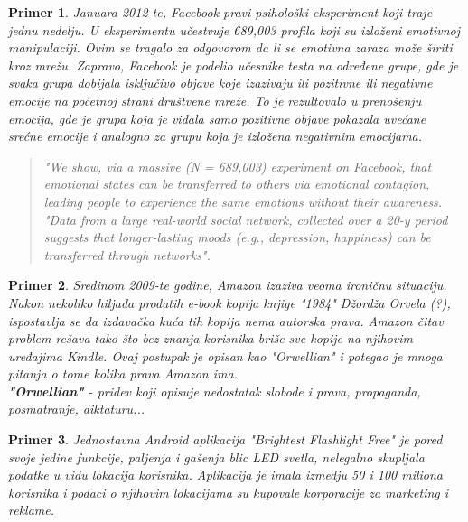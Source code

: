 \documentclass[a4paper]{article}
\newtheorem{primer}{Primer}[section]
\begin{document}
\begin{primer}
	Januara 2012-te, Facebook pravi psihološki eksperiment koji 
traje jednu nedelju. U eksperimentu učestvuje 689,003 profila koji su izloženi emotivnoj manipulaciji. Ovim se tragalo za odgovorom da li se emotivna zaraza može širiti kroz mrežu. Zapravo, Facebook je podelio učesnike testa na određene grupe, gde je svaka grupa dobijala isključivo objave koje izazivaju ili pozitivne ili negativne emocije na početnoj strani društvene mreže. To je rezultovalo u prenošenju emocija, gde je grupa koja je viđala samo pozitivne objave pokazala uvećane srećne emocije i analogno 	za grupu koja je izložena negativnim emocijama. \cite{?}
\begin{quotation}
	\textit{"We show, via a massive (N = 689,003) experiment on Facebook, that emotional states can be transferred to others via emotional contagion, leading people to experience the same emotions without their awareness.
"Data from a large real-world social network, collected over a 20-y period suggests that longer-lasting moods (e.g., depression, happiness) can be transferred through networks". \cite{?}}\\
\end{quotation}
\end{primer}

\begin{primer}
	Sredinom 2009-te godine, Amazon izaziva veoma ironičnu 
situaciju. Nakon nekoliko hiljada prodatih e-book kopija knjige "1984" Džordža Orvela (?), ispostavlja se da izdavačka kuća tih kopija nema autorska prava. Amazon čitav problem rešava tako što bez znanja korisnika briše sve kopije na njihovim uređajima Kindle. Ovaj postupak je opisan kao "Orwellian" i potegao je mnoga pitanja o tome kolika prava Amazon ima. \cite{?}\\

\textbf{"Orwellian"} - \textit{pridev koji opisuje nedostatak slobode i prava, propaganda, posmatranje, diktaturu...}\\
\end{primer}

\begin{primer}
	Jednostavna Android aplikacija "Brightest Flashlight 
Free" je pored svoje jedine funkcije, paljenja i gašenja blic LED svetla, nelegalno skupljala podatke u vidu lokacija korisnika. Aplikacija je imala izmedju 50 i 100 miliona korisnika i podaci o njihovim lokacijama su kupovale korporacije za marketing i reklame.\cite{?}\\
\end{primer}
\end{document}
